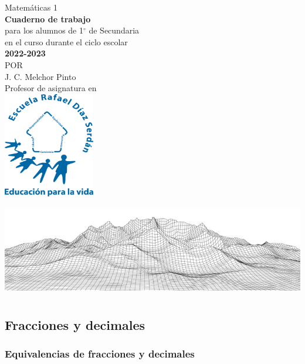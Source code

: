 \documentclass[11pt]{book}
\begin{document}
\pagestyle{empty}
\begin{center}
  {\Huge Matem\'aticas 1}\\
  \vspace{2cm}
  \normalsize
  \textbf{\large Cuaderno de trabajo}\\
  para los alumnos de 1$^\circ$ de  Secundaria\\
  en el curso durante el ciclo escolar\\
  \textbf{2022-2023}\\
  \vspace{2.5cm}
  \small POR\\
  \Large J. C. Melchor Pinto\\[0.5em]
  \normalsize Profesor de asignatura en\\
  \vspace{1cm}
  \includegraphics[width=4cm]{./Unidad 2/Images/LOGO_RDS_nobg}
\end{center}
\vspace{2cm}
%
\hspace{-16mm}
\includegraphics[width=\paperwidth]{./Unidad 2/Images/cover_bg_short}
\restoregeometry
\tableofcontents
\chapter{}
\section{Fracciones y decimales}
\subsection{Equivalencias de fracciones y decimales}
\end{document}
